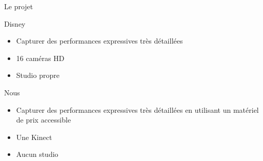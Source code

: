 \documentclass[compress,pdf,11pt,xcolor=dvipsnames]{beamer}
\begin{document}
\begin{frame}{Le projet}

  \begin{block}{Disney}
    \begin{itemize}
    \item Capturer des performances expressives très
      détaillées
    \item 16 caméras HD
    \item Studio propre
    \end{itemize}
  \end{block}
  
  \begin{alertblock}{Nous}
    \begin{itemize}
    \item Capturer des performances expressives très
      détaillées en utilisant un matériel de prix accessible
    \item Une Kinect
    \item Aucun studio
    \end{itemize}
  \end{alertblock}


    
\end{frame}
\end{document}
